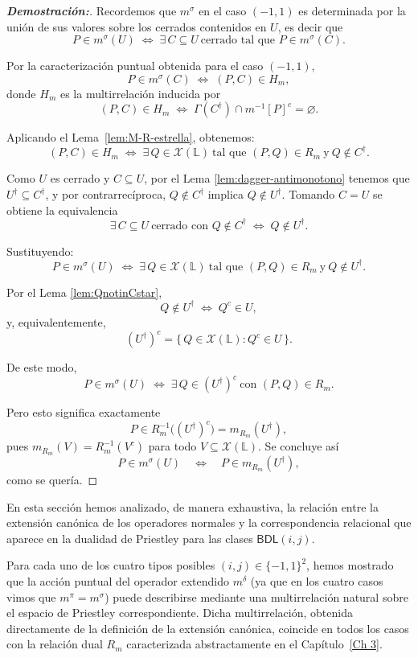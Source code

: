 \documentclass[12pt]{book}
\newcommand{\BDL}{\mathsf{BDL}}
\begin{document}
\begin{proof}[\textbf{Demostración:}]
Recordemos que $m^\sigma$ en el caso $(-1,1)$ es determinada por la unión de sus valores sobre los cerrados contenidos en $U$, es decir que
\[
P\in m^\sigma(U)
\;\Longleftrightarrow\;
\exists\, C\subseteq U\ \text{cerrado tal que } P\in m^\sigma(C).
\]

Por la caracterización puntual obtenida para el caso $(-1,1)$,
\[
P\in m^\sigma(C)
\;\Longleftrightarrow\;
(P,C)\in H_m,
\]
donde $H_m$ es la multirrelación inducida por
\[
(P,C)\in H_m
\;\Longleftrightarrow\;
\Gamma(C^{\dagger})\cap m^{-1}[P]^{c}=\varnothing.
\]

Aplicando el Lema~\ref{lem:M-R-estrella}, obtenemos:
\[
(P,C)\in H_m
\;\Longleftrightarrow\;
\exists\,Q\in\mathcal X(\mathbb L)\ 
\text{tal que }(P,Q)\in R_m\ \text{y}\ Q\notin C^{\dagger}.
\]

Como $U$ es cerrado y $C\subseteq U$, por el Lema \ref{lem:dagger-antimonotono} tenemos que $U^{\dagger}\subseteq C^{\dagger}$, y por contrarrecíproca,
$Q\notin C^{\dagger}$ implica $Q\notin U^{\dagger}$.
Tomando $C=U$ se obtiene la equivalencia
\[
\exists\,C\subseteq U\ \text{cerrado con }Q\notin C^{\dagger}
\;\Longleftrightarrow\;
Q\notin U^{\dagger}.
\]

Sustituyendo:
\[
P\in m^\sigma(U)
\;\Longleftrightarrow\;
\exists\,Q\in\mathcal X(\mathbb L)\ 
\text{tal que }(P,Q)\in R_m\ \text{y}\ Q\notin U^{\dagger}.
\]

Por el Lema \ref{lem:QnotinCstar},
\[
Q\notin U^{\dagger}
\;\Longleftrightarrow\;
Q^{c}\in U,
\]
y, equivalentemente,
\[
(U^{\dagger})^{c}
=
\{\,Q\in\mathcal X(\mathbb L):Q^{c}\in U\,\}.
\]

De este modo,
\[
P\in m^\sigma(U)
\;\Longleftrightarrow\;
\exists\,Q\in (U^{\dagger})^{c}\ 
\text{con }(P,Q)\in R_m.
\]

Pero esto significa exactamente
\[
P\in R_m^{-1}\bigl((U^{\dagger})^{c}\bigr)
=
m_{R_m}(U^{\dagger}),
\]
pues $m_{R_m}(V)=R_m^{-1}(V^{c})$ para todo $V\subseteq\mathcal X(\mathbb L)$. Se concluye así
\[
P\in m^\sigma(U)
\quad\Longleftrightarrow\quad
P\in m_{R_m}(U^{\dagger}),
\]
como se quería.
\end{proof}

En esta sección hemos analizado, de manera exhaustiva, la relación entre la extensión canónica de los operadores normales y la correspondencia relacional que aparece en la dualidad de Priestley
para las clases $\BDL(i,j)$.

Para cada uno de los cuatro tipos posibles $(i,j)\in\{-1,1\}^2$,
hemos mostrado que la acción puntual del operador extendido
$m^\delta$ (ya que en los cuatro casos vimos que $m^\pi=m^\sigma$)
puede describirse mediante una multirrelación natural sobre 
el espacio de Priestley correspondiente.
Dicha multirrelación, obtenida directamente de la definición de
la extensión canónica, coincide en todos los casos con la relación 
dual $R_m$ caracterizada abstractamente en el 
Capítulo~\ref{Ch 3}.
\end{document}
